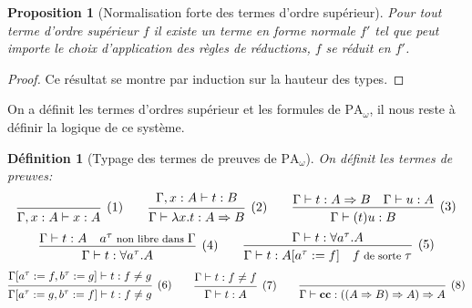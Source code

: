 \documentclass[a4paper,12pt]{article}
\newtheorem{prop}[theo]{Proposition}
\newtheorem{defi}[theo]{Définition}
\theoremstyle{rmqstyle}
\newcommand{\PA}{\mathrm{PA}}
\renewcommand{\implies}{\Rightarrow}
\newcommand{\cc}{\mathbf{cc}}
\begin{document}
\begin{prop}[Normalisation forte des termes d'ordre supérieur]
Pour tout terme d'ordre supérieur $f$ il existe un terme en forme normale $f'$ tel que peut importe le choix d'application des règles de réductions, $f$ se réduit en $f'$.
\end{prop}

\begin{proof}
Ce résultat se montre par induction sur la hauteur des types.
\end{proof}

On a définit les termes d'ordres supérieur et les formules de $\PA_\omega$, il nous reste à définir la logique de ce système. 

\begin{defi}[Typage des termes de preuves de $\PA_\omega$]
On définit les termes de preuves:
$$
\begin{prooftree}[center=false]
\infer0[(1)]{\Gamma, x : A \vdash x : A}
\end{prooftree}
\qquad
\begin{prooftree}[center=false]
\hypo{\Gamma, x : A \vdash t : B}
\infer1[(2)]{\Gamma \vdash \lambda x.t : A \implies B}
\end{prooftree}
\qquad
\begin{prooftree}[center=false]
\hypo{\Gamma \vdash t : A \implies B \quad \Gamma \vdash u : A}
\infer1[(3)]{\Gamma \vdash (t)u : B}
\end{prooftree}
$$
$$
\begin{prooftree}[center=false]
\hypo{\Gamma \vdash t : A \quad {\footnotesize a^\tau \text{ non libre dans } \Gamma}}
\infer1[(4)]{\Gamma \vdash t : \forall a^\tau. A}
\end{prooftree}
\qquad
\begin{prooftree}[center=false]
\hypo{\Gamma \vdash t : \forall a^\tau. A}
\infer1[(5)]{\Gamma \vdash t :A[a^\tau := f] \quad {\footnotesize f \text{ de sorte } \tau}}
\end{prooftree}
$$
$$
\begin{prooftree}[center=false]
\hypo{\Gamma[a^\tau := f, b^\tau := g] \vdash t : f \neq g}
\infer1[(6)]{\Gamma[a^\tau := g, b^\tau := f] \vdash t : f \neq g}
\end{prooftree}
\qquad
\begin{prooftree}[center=false]
\hypo{\Gamma \vdash t : f \neq f}
\infer1[(7)]{\Gamma \vdash t : A}
\end{prooftree}
\qquad
\begin{prooftree}[center=false]
\infer0[(8)]{\Gamma \vdash \cc : ((A \implies B) \implies A) \implies A}
\end{prooftree}
$$
\end{defi}
\end{document}
